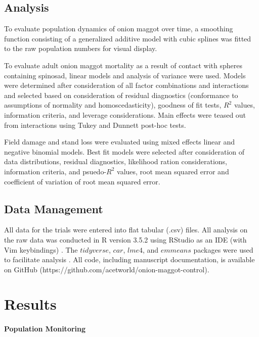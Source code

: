 \documentclass[alpha-refs]{wiley-article}
\begin{document}
\subsection{Analysis}

To evaluate population dynamics of onion maggot over time, a smoothing function consisting of a generalized additive model with cubic splines was fitted to the raw population numbers for visual display.  

To evaluate adult onion maggot mortality as a result of contact with spheres containing spinosad, linear models and analysis of variance were used.  Models were determined after consideration of all factor combinations and interactions and selected based on consideration of residual diagnostics (conformance to assumptions of normality and homoscedasticity), goodness of fit tests, $R^2$ values, information criteria, and leverage considerations. Main effects were teased out from interactions using Tukey and Dunnett post-hoc tests.  

Field damage and stand loss were evaluated using mixed effects linear and negative binomial models.  Best fit models were selected after consideration of data distributions, residual diagnostics, likelihood ration considerations, information criteria, and psuedo-$R^2$ values, root mean squared error and coefficient of variation of root mean squared error.  


\subsection{Data Management}

All data for the trials were entered into flat tabular (.csv) files.  All analysis on the raw data was conducted in R version 3.5.2 using RStudio as an IDE (with Vim keybindings) \citep{rcore2018,rstudio}.  The $tidyverse$, $car$, $lme4$, and $emmeans$ packages were used to facilitate analysis \citep{tidy, car, lme, emmeans}.  All code, including manuscript documentation, is available on GitHub (https://github.com/acetworld/onion-maggot-control).


\section{Results}

\paragraph{Population Monitoring}
\end{document}
